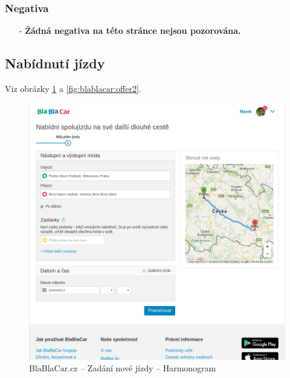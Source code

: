 \subsubsection*{Negativa}
\begin{itemize}
    \item[-] \textbf{Žádná negativa na této stránce nejsou pozorována.}
\end{itemize}



\newpage
\subsection{Nabídnutí jízdy}
Viz obrázky \ref{fig:blablacar:offer} a \ref{fig:blablacar:offer2}.
\begin{figure}[h]
    \centering
    \includegraphics[width=1.0\textwidth]{media/blablacar/offer.png}
    \caption{BlaBlaCar.cz -- Zadání nové jízdy -- Harmonogram}
    \label{fig:blablacar:offer}
\end{figure}
